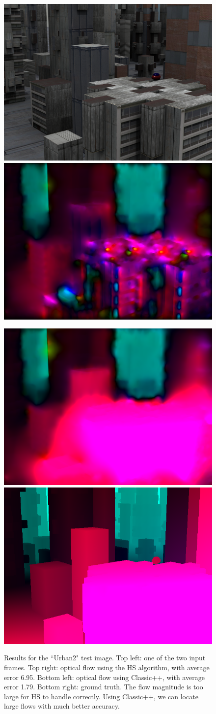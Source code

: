 \documentclass[10pt,twocolumn,letterpaper]{article}
\begin{document}
\begin{figure}
\includegraphics[width=0.48 \columnwidth] {urban2_input.png} 
\includegraphics[width=0.48 \columnwidth] {urban2.png}

\includegraphics[width=0.48 \columnwidth] {urban2_multires.png} 
\includegraphics[width=0.48 \columnwidth] {urban2_truth.png} 

\caption{Results for the ``Urban2" test image.  Top left: one of the two input frames.  Top right: optical flow using the HS algorithm, with average error 6.95.  Bottom left: optical flow using Classic++, with average error 1.79.  Bottom right: ground truth.  The flow magnitude is too large for HS to handle correctly.  Using Classic++, we can locate large flows with much better accuracy.}
\label{fig:urban2}
\end{figure}
\end{document}
